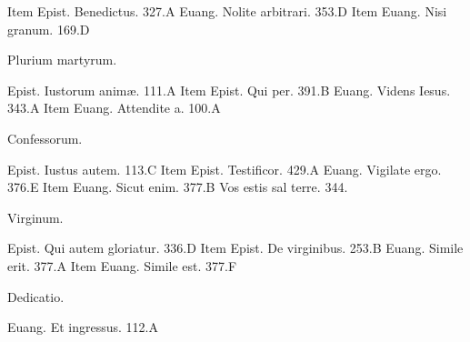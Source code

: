 \documentclass[a5paper,10pt]{book}
\def\ae{æ}
\begin{document}
\begin{multicols}{2}
\newline Item Epist. Benedictus. \hfill 327.A
\newline Euang. Nolite arbitrari. \hfill 353.D
\newline Item Euang. Nisi granum. \hfill 169.D
\newline \vspace{-1.75em}
\begin{center}
\color{red} Plurium martyrum.
\end{center}
\vspace{-.75em}
\par \noindent Epist. Iustorum anim\ae . \hfill 111.A
\newline Item Epist. Qui per. \hfill 391.B
\newline Euang. Videns Iesus. \hfill 343.A
\newline Item Euang. Attendite a. \hfill 100.A
\newline \vspace{-1.75em}
\begin{center}
\color{red} Confessorum.
\end{center}
\vspace{-.75em}
\par \noindent Epist. Iustus autem. \hfill 113.C
\newline Item Epist. Testificor. \hfill 429.A
\newline Euang. Vigilate ergo. \hfill 376.E
\newline Item Euang. Sicut enim. \hfill 377.B
\newline Vos estis sal terre. \hfill 344.%
\newline \vspace{-1.75em}
\begin{center}
\color{red} Virginum.
\end{center}
\vspace{-.75em}
\par \noindent Epist. Qui autem gloriatur. \hfill 336.D %
\newline Item Epist. De virginibus. \hfill 253.B
\newline Euang. Simile erit. \hfill 377.A
\newline Item Euang. Simile est. \hfill 377.F
\newline \vspace{-1.75em}
\begin{center}
\color{red} Dedicatio.
\end{center}
\vspace{-.75em}
\par \noindent Euang. Et ingressus. \hfill 112.A
\end{multicols}
\end{document}
